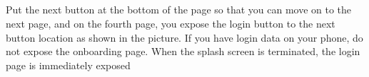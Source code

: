 \documentclass[conference]{IEEEtran}
\begin{document}
\begin{enumerate}
    \\ \\ \\ \\ \\ \\ \\ \\ \\ Put the next button at the bottom of the page so that you can move on to the next page, and on the fourth page, you expose the login button to the next button location as shown in the picture.
    If you have login data on your phone, do not expose the onboarding page. When the splash screen is terminated, the login page is immediately exposed \\ \\ 
    \end{enumerate}
    \break
\end{document}
